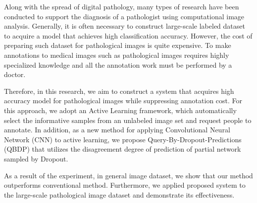 Along with the spread of digital pathology, many types of research have been conducted to support the diagnosis of a pathologist using computational image analysis.
Generally, it is often necessary to construct large-scale labeled dataset to acquire a model that achieves high classification accuracy.
However, the cost of preparing such dataset for pathological images is quite expensive.
To make annotations to medical images such as pathological images requires highly specialized knowledge 
and all the annotation work must be performed by a doctor.

Therefore, in this research, we aim to construct a system that acquires high accuracy model for pathological images while suppressing annotation cost.
For this approach, we adopt an Active Learning framework, which automatically select the informative samples from an unlabeled image set and request people to annotate.
In addition, as a new method for applying Convolutional Neural Network (CNN) to active learning,
we propose Query-By-Dropout-Predictions (QBDP) that utilizes the disagreement degree of prediction of partial network sampled by Dropout.

As a result of the experiment, in general image dataset, we show that our method outperforms conventional method.
Furthermore, we applied proposed system to the large-scale pathological image dataset and demonstrate its effectiveness.

